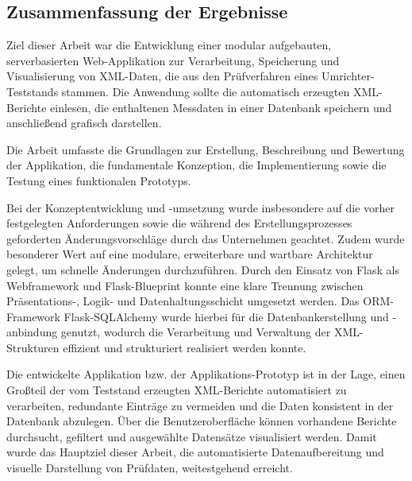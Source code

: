 \subsection{Zusammenfassung der Ergebnisse}
\label{subsec:zusammenfassung-der-ergebnisse}

Ziel dieser Arbeit war die Entwicklung einer modular aufgebauten, serverbasierten Web-Applikation zur Verarbeitung,
Speicherung und Visualisierung von XML-Daten, die aus den Prüfverfahren eines Umrichter-Teststands stammen.
Die Anwendung sollte die automatisch erzeugten XML-Berichte einlesen,
die enthaltenen Messdaten in einer Datenbank speichern und anschließend grafisch darstellen.

Die Arbeit umfasste die Grundlagen zur Erstellung, Beschreibung und Bewertung der Applikation, die fundamentale Konzeption, die Implementierung sowie die Testung eines funktionalen Prototyps.

Bei der Konzeptentwicklung und -umsetzung wurde insbesondere auf die vorher festgelegten Anforderungen sowie die während des Erstellungsprozesses geforderten Änderungsvorschläge durch das Unternehmen geachtet.
Zudem wurde besonderer Wert auf eine modulare, erweiterbare und wartbare Architektur gelegt, um schnelle Änderungen durchzuführen.
Durch den Einsatz von Flask als Webframework und Flask-Blueprint konnte eine klare Trennung zwischen Präsentations-, Logik- und Datenhaltungsschicht umgesetzt werden.
Das ORM-Framework Flask-SQLAlchemy wurde hierbei für die Datenbankerstellung und -anbindung genutzt, wodurch die Verarbeitung und Verwaltung der XML-Strukturen effizient und strukturiert realisiert werden konnte.

Die entwickelte Applikation bzw. der Applikations-Prototyp ist in der Lage, einen Großteil der vom Teststand erzeugten XML-Berichte automatisiert zu verarbeiten, redundante Einträge zu vermeiden und die Daten konsistent in der Datenbank abzulegen.
Über die Benutzeroberfläche können vorhandene Berichte durchsucht, gefiltert und ausgewählte Datensätze visualisiert werden.
Damit wurde das Hauptziel dieser Arbeit, die automatisierte Datenaufbereitung und visuelle Darstellung von Prüfdaten, weitestgehend erreicht.




